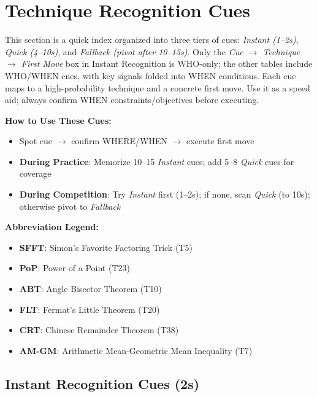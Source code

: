\documentclass{article}
\begin{document}
\newpage

\section{Technique Recognition Cues}
\hypertarget{ircues}{}
\hypertarget{technique-cues}{}
\hypertarget{ptqr}{}

\begin{tcolorbox}[colback=blue!5!white,colframe=blue!75!black,title={\textbf{Section Overview and Usage}}]
This section is a quick index organized into three tiers of cues: \textit{Instant (1--2s)}, \textit{Quick (4--10s)}, and \textit{Fallback (pivot after 10--15s)}. Only the \textit{Cue $\rightarrow$ Technique $\rightarrow$ First Move} box in Instant Recognition is WHO-only; the other tables include WHO/WHEN cues, with key signals folded into WHEN conditions. Each cue maps to a high-probability technique and a concrete first move. Use it as a speed aid; always confirm WHEN constraints/objectives before executing.

\textbf{How to Use These Cues:}
\begin{itemize}[nosep]
\item Spot cue $\rightarrow$ confirm WHERE/WHEN $\rightarrow$ execute first move
\item \textbf{During Practice}: Memorize 10--15 \textit{Instant} cues; add 5--8 \textit{Quick} cues for coverage
\item \textbf{During Competition}: Try \textit{Instant} first (1--2s); if none, scan \textit{Quick} (to 10s); otherwise pivot to \textit{Fallback}
\end{itemize}

\textbf{Abbreviation Legend:}
\begin{itemize}[nosep]
\item \textbf{SFFT}: Simon's Favorite Factoring Trick (T5)
\item \textbf{PoP}: Power of a Point (T23)
\item \textbf{ABT}: Angle Bisector Theorem (T10)
\item \textbf{FLT}: Fermat's Little Theorem (T20)
\item \textbf{CRT}: Chinese Remainder Theorem (T38)
\item \textbf{AM-GM}: Arithmetic Mean-Geometric Mean Inequality (T7)
\end{itemize}
\end{tcolorbox}

\newpage

\subsection{Instant Recognition Cues (2s)}
{\footnotesize\textcolor{timegreen}{}}\\
\end{document}
